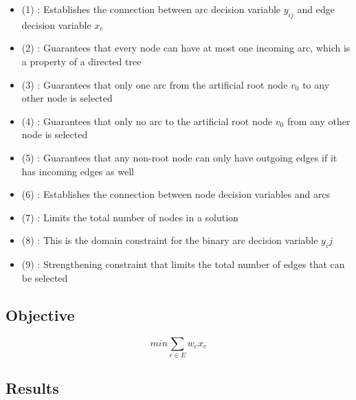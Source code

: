 \begin{itemize}
	\item (1) : Establishes the connection between arc decision variable $y_{ij}$ and edge decision variable $x_e$
	\item (2) : Guarantees that every node can have at most one incoming arc, which is a property of a directed tree
	\item (3) : Guarantees that only one arc from the artificial root node $v_0$ to any other node is selected
   	\item (4) : Guarantees that only no arc to the artificial root node $v_0$ from any other node is selected
   	\item (5) : Guarantees that any non-root node can only have outgoing edges if it has incoming edges as well
   	\item (6) : Establishes the connection between node decision variables and arcs
   	\item (7) : Limits the total number of nodes in a solution
	\item (8) : This is the domain constraint for the binary arc decision variable $y_ij$
	\item (9) : Strengthening constraint that limits the total number of edges that can be selected
\end{itemize}

\subsection{Objective}

\[ min \sum_{e \in E}w_ex_e \]

\subsection{Results} \label{4:4}

